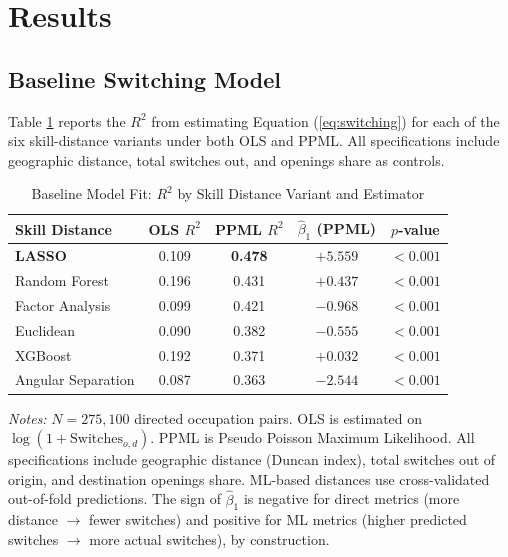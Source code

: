 \documentclass[12pt]{article}
\begin{document}
\section{Results}
\label{sec:results}

\subsection{Baseline Switching Model}
\label{sec:results_baseline}

Table \ref{tab:baseline_r2} reports the $R^2$ from estimating Equation (\ref{eq:switching}) for each of the six skill-distance variants under both OLS and PPML. All specifications include geographic distance, total switches out, and openings share as controls.

\begin{table}[H]
\centering
\caption{Baseline Model Fit: $R^2$ by Skill Distance Variant and Estimator}
\label{tab:baseline_r2}
\begin{tabular}{lcccc}
\toprule
\textbf{Skill Distance} & \textbf{OLS $R^2$} & \textbf{PPML $R^2$} & \textbf{$\hat{\beta}_1$ (PPML)} & \textbf{$p$-value} \\
\midrule
\textbf{LASSO}              & 0.109 & \textbf{0.478} & $+5.559$ & $<0.001$ \\
Random Forest               & 0.196 & 0.431         & $+0.437$ & $<0.001$ \\
Factor Analysis             & 0.099 & 0.421         & $-0.968$ & $<0.001$ \\
Euclidean                   & 0.090 & 0.382         & $-0.555$ & $<0.001$ \\
XGBoost                     & 0.192 & 0.371         & $+0.032$ & $<0.001$ \\
Angular Separation          & 0.087 & 0.363         & $-2.544$ & $<0.001$ \\
\bottomrule
\end{tabular}
\begin{minipage}{0.9\textwidth}
\vspace{0.5em}
\footnotesize \textit{Notes:} $N = 275{,}100$ directed occupation pairs. OLS is estimated on $\log(1 + \text{Switches}_{o,d})$. PPML is Pseudo Poisson Maximum Likelihood. All specifications include geographic distance (Duncan index), total switches out of origin, and destination openings share. ML-based distances use cross-validated out-of-fold predictions. The sign of $\hat{\beta}_1$ is negative for direct metrics (more distance $\to$ fewer switches) and positive for ML metrics (higher predicted switches $\to$ more actual switches), by construction.
\end{minipage}
\end{table}
\end{document}
